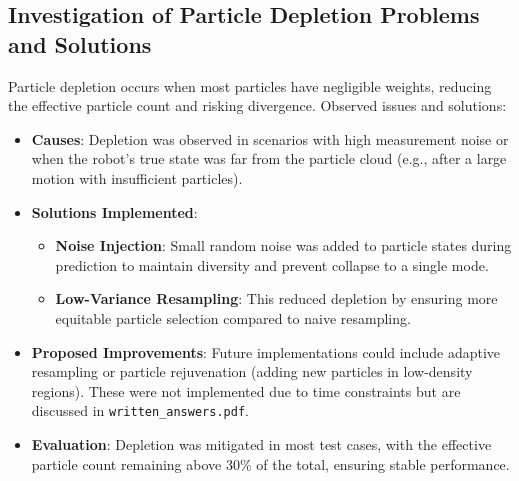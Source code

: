 \documentclass[11pt]{article}
\begin{document}
\subsection{Investigation of Particle Depletion Problems and Solutions}
Particle depletion occurs when most particles have negligible weights, reducing the effective particle count and risking divergence. Observed issues and solutions:
\begin{itemize}
    \item \textbf{Causes}: Depletion was observed in scenarios with high measurement noise or when the robot's true state was far from the particle cloud (e.g., after a large motion with insufficient particles).
    \item \textbf{Solutions Implemented}:
        \begin{itemize}
            \item \textbf{Noise Injection}: Small random noise was added to particle states during prediction to maintain diversity and prevent collapse to a single mode.
            \item \textbf{Low-Variance Resampling}: This reduced depletion by ensuring more equitable particle selection compared to naive resampling.
        \end{itemize}
    \item \textbf{Proposed Improvements}: Future implementations could include adaptive resampling or particle rejuvenation (adding new particles in low-density regions). These were not implemented due to time constraints but are discussed in \texttt{written\_answers.pdf}.
    \item \textbf{Evaluation}: Depletion was mitigated in most test cases, with the effective particle count remaining above 30\% of the total, ensuring stable performance.
\end{itemize}
\end{document}

